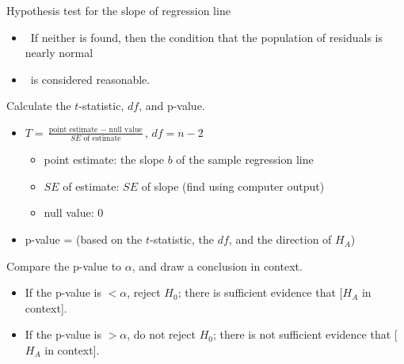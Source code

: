 \begin{onebox}{Hypothesis test for the slope of regression line}
\begin{itemize}
\item[] \ \quad If neither is found, then the condition that the population of residuals is nearly normal 
\item[] \ \quad is considered reasonable.  
\end{itemize}
   Calculate the $t$-statistic, $df$, and p-value.
\begin{itemize}
\item[] $T= \frac{\text{point estimate } - \text{ null value}}{SE \text{ of estimate}}$, \quad $df=n-2$
\begin{itemize}
\item[] point estimate: the slope $b$ of the sample regression line
\item[] $SE$ of estimate:  $SE$ of slope (find using computer output)
\item[] null value: 0
\end{itemize}
\item[] p-value = (based on the $t$-statistic, the $df$, and the direction of $H_A$)
\end{itemize}
  Compare the p-value to $\alpha$, and draw a conclusion in context. \vspace{-1mm}
\begin{itemize}
\item[] If the p-value is $< \alpha$, reject $H_0$; there is sufficient evidence that [$H_A$ in context]. 
\item[] If the p-value is $> \alpha$, do not reject $H_0$; there is not sufficient evidence that [$H_A$ in context].
\end{itemize}\end{onebox}


